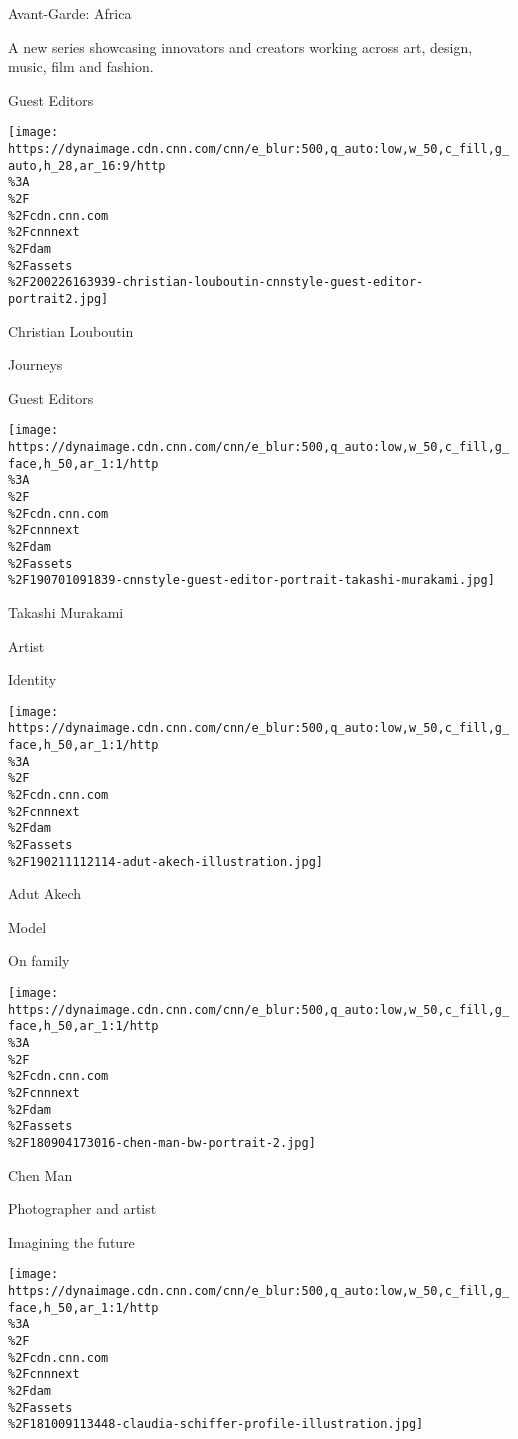 Avant-Garde: Africa

A new series showcasing innovators and creators working across art,
design, music, film and fashion.

Guest Editors

\href{https://edition.cnn.com/style/profiles/christian-louboutin}{}

\texttt{[image: https://dynaimage.cdn.cnn.com/cnn/e\_blur:500,q\_auto:low,w\_50,c\_fill,g\_auto,h\_28,ar\_16:9/http\\\%3A\\\%2F\\\%2Fcdn.cnn.com\\\%2Fcnnnext\\\%2Fdam\\\%2Fassets\\\%2F200226163939-christian-louboutin-cnnstyle-guest-editor-portrait2.jpg]}

\href{https://edition.cnn.com/style/profiles/christian-louboutin}{}

Christian Louboutin

Journeys

Guest Editors

\href{/style/profiles/takashi-murakami}{}

\texttt{[image: https://dynaimage.cdn.cnn.com/cnn/e\_blur:500,q\_auto:low,w\_50,c\_fill,g\_face,h\_50,ar\_1:1/http\\\%3A\\\%2F\\\%2Fcdn.cnn.com\\\%2Fcnnnext\\\%2Fdam\\\%2Fassets\\\%2F190701091839-cnnstyle-guest-editor-portrait-takashi-murakami.jpg]}

Takashi Murakami

Artist

Identity

\href{/style/profiles/adut-akech}{}

\texttt{[image: https://dynaimage.cdn.cnn.com/cnn/e\_blur:500,q\_auto:low,w\_50,c\_fill,g\_face,h\_50,ar\_1:1/http\\\%3A\\\%2F\\\%2Fcdn.cnn.com\\\%2Fcnnnext\\\%2Fdam\\\%2Fassets\\\%2F190211112114-adut-akech-illustration.jpg]}

Adut Akech

Model

On family

\href{/style/profiles/chen-man}{}

\texttt{[image: https://dynaimage.cdn.cnn.com/cnn/e\_blur:500,q\_auto:low,w\_50,c\_fill,g\_face,h\_50,ar\_1:1/http\\\%3A\\\%2F\\\%2Fcdn.cnn.com\\\%2Fcnnnext\\\%2Fdam\\\%2Fassets\\\%2F180904173016-chen-man-bw-portrait-2.jpg]}

Chen Man

Photographer and artist

Imagining the future

\href{/style/profiles/claudia-schiffer}{}

\texttt{[image: https://dynaimage.cdn.cnn.com/cnn/e\_blur:500,q\_auto:low,w\_50,c\_fill,g\_face,h\_50,ar\_1:1/http\\\%3A\\\%2F\\\%2Fcdn.cnn.com\\\%2Fcnnnext\\\%2Fdam\\\%2Fassets\\\%2F181009113448-claudia-schiffer-profile-illustration.jpg]}

